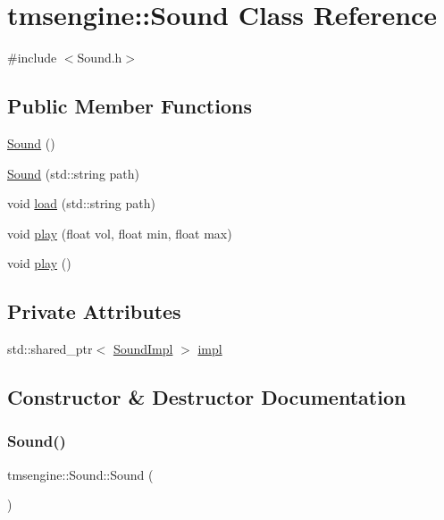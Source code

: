 \hypertarget{classtmsengine_1_1_sound}{}\section{tmsengine\+:\+:Sound Class Reference}
\label{classtmsengine_1_1_sound}


{\ttfamily \#include $<$Sound.\+h$>$}

\subsection*{Public Member Functions}
\begin{DoxyCompactItemize}
\item 
\hyperlink{classtmsengine_1_1_sound_a0da875f18794380a2f8a6e9d02e9d0cd}{Sound} ()
\item 
\hyperlink{classtmsengine_1_1_sound_a666456cd06cec8089d5be3fce56132f1}{Sound} (std\+::string path)
\item 
void \hyperlink{classtmsengine_1_1_sound_aca383fe0b166a15eae25580e1e1e8d41}{load} (std\+::string path)
\item 
void \hyperlink{classtmsengine_1_1_sound_aeb5717b4ce5f64b7c1e696f471730486}{play} (float vol, float min, float max)
\item 
void \hyperlink{classtmsengine_1_1_sound_a842d33a838588ed6a4652b427faa5e0a}{play} ()
\end{DoxyCompactItemize}
\subsection*{Private Attributes}
\begin{DoxyCompactItemize}
\item 
std\+::shared\+\_\+ptr$<$ \hyperlink{structtmsengine_1_1_sound_impl}{Sound\+Impl} $>$ \hyperlink{classtmsengine_1_1_sound_ac6c9ad2ebd7410f0cdc0d58a3891a5b8}{impl}
\end{DoxyCompactItemize}


\subsection{Constructor \& Destructor Documentation}
\mbox{\label{classtmsengine_1_1_sound_a0da875f18794380a2f8a6e9d02e9d0cd}} 
\subsubsection{\texorpdfstring{Sound()}{Sound()}\hspace{0.1cm}{\footnotesize\ttfamily [1/2]}}
{\footnotesize\ttfamily tmsengine\+::\+Sound\+::\+Sound (\begin{DoxyParamCaption}{ }\end{DoxyParamCaption})}

